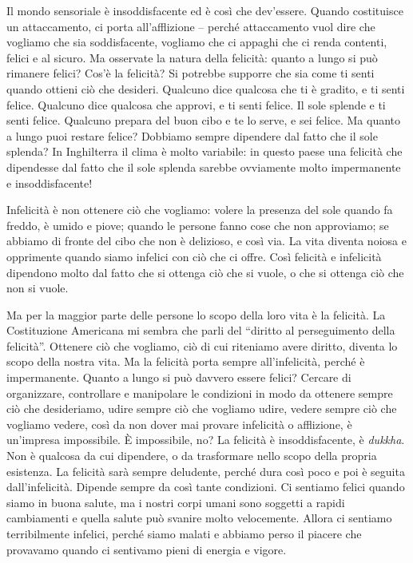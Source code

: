 Il mondo sensoriale è insoddisfacente ed è così che dev'essere. Quando
costituisce un attaccamento, ci porta all'afflizione -- perché
attaccamento vuol dire che vogliamo che sia soddisfacente, vogliamo che
ci appaghi che ci renda contenti, felici e al sicuro. Ma osservate la
natura della felicità: quanto a lungo si può rimanere felici? Cos'è la
felicità? Si potrebbe supporre che sia come ti senti quando ottieni ciò
che desideri. Qualcuno dice qualcosa che ti è gradito, e ti senti
felice. Qualcuno dice qualcosa che approvi, e ti senti felice. Il sole
splende e ti senti felice. Qualcuno prepara del buon cibo e te lo serve,
e sei felice. Ma quanto a lungo puoi restare felice? Dobbiamo sempre
dipendere dal fatto che il sole splenda? In Inghilterra il clima è molto
variabile: in questo paese una felicità che dipendesse dal fatto che il
sole splenda sarebbe ovviamente molto impermanente e insoddisfacente!

Infelicità è non ottenere ciò che vogliamo: volere la presenza del sole
quando fa freddo, è umido e piove; quando le persone fanno cose che non
approviamo; se abbiamo di fronte del cibo che non è delizioso, e così
via. La vita diventa noiosa e opprimente quando siamo infelici con ciò
che ci offre. Così felicità e infelicità dipendono molto dal fatto che
si ottenga ciò che si vuole, o che si ottenga ciò che non si vuole.

Ma per la maggior parte delle persone lo scopo della loro vita è la
felicità. La Costituzione Americana mi sembra che parli del ``diritto al
perseguimento della felicità''. Ottenere ciò che vogliamo, ciò di cui
riteniamo avere diritto, diventa lo scopo della nostra vita. Ma la
felicità porta sempre all'infelicità, perché è impermanente. Quanto a
lungo si può davvero essere felici? Cercare di organizzare, controllare
e manipolare le condizioni in modo da ottenere sempre ciò che
desideriamo, udire sempre ciò che vogliamo udire, vedere sempre ciò che
vogliamo vedere, così da non dover mai provare infelicità o afflizione,
è un'impresa impossibile. È impossibile, no? La felicità è
insoddisfacente, è \emph{dukkha}. Non è qualcosa da cui dipendere, o da
trasformare nello scopo della propria esistenza. La felicità sarà sempre
deludente, perché dura così poco e poi è seguita dall'infelicità.
Dipende sempre da così tante condizioni. Ci sentiamo felici quando siamo
in buona salute, ma i nostri corpi umani sono soggetti a rapidi
cambiamenti e quella salute può svanire molto velocemente. Allora ci
sentiamo terribilmente infelici, perché siamo malati e abbiamo perso il
piacere che provavamo quando ci sentivamo pieni di energia e vigore.

